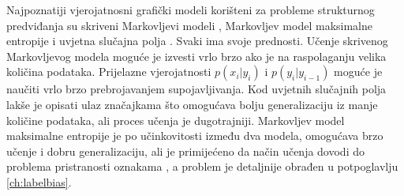Najpoznatiji vjerojatnosni grafički modeli korišteni za probleme strukturnog
predviđanja su skriveni Markovljevi modeli ,
Markovljev model maksimalne entropije 
i uvjetna slučajna polja . Svaki ima
svoje prednosti. Učenje skrivenog Markovljevog modela moguće je izvesti vrlo
brzo ako je na raspolaganju velika količina podataka. Prijelazne vjerojatnosti
$p(x_i | y_i)$ i $p(y_i | y_{i-1})$ moguće je naučiti vrlo brzo
prebrojavanjem supojavljivanja. Kod uvjetnih slučajnih polja lakše je opisati
ulaz značajkama što omogućava bolju generalizaciju iz manje količine podataka,
ali proces učenja je dugotrajniji. Markovljev model maksimalne entropije je po
učinkovitosti između dva modela, omogućava brzo učenje i dobru generalizaciju,
ali je primijećeno da način učenja dovodi do problema pristranosti oznakama
 \citep{lafferty2001conditional}, a problem je detaljnije
obrađen u potpoglavlju \ref{ch:labelbias}.

